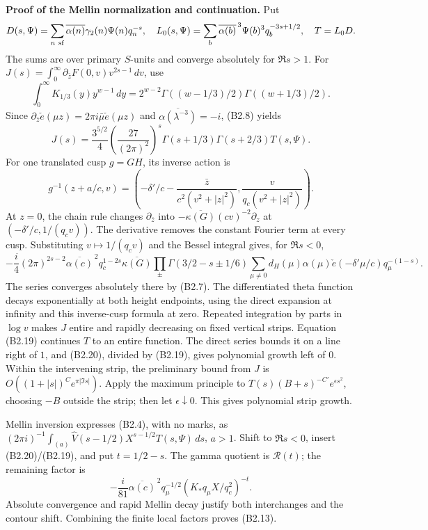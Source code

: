 \documentclass[11pt,a4paper]{article}
\begin{document}
\textbf{Proof of the Mellin normalization and continuation.} Put \[
D(s,\Psi)=\sum_{n\ {\rm sf}}\overline{\alpha(n)}\gamma_2(n)\Psi(n)q_n^{-s},
\quad L_0(s,\Psi)=\sum_b\overline{\alpha(b)}^{\,3}\Psi(b)^3q_b^{-3s+1/2},
\quad T=L_0D.
\] The sums are over primary \(S\)-units and converge absolutely for
\(\Re s>1\). For
\(J(s)=\int_0^\infty\partial_{\bar z}F(0,\allowbreak{}v)v^{2s-1}\,\allowbreak{}dv\), use \[
\int_0^\infty K_{1/3}(y)y^{w-1}\,dy
=2^{w-2}\Gamma((w-1/3)/2)\Gamma((w+1/3)/2).
\] Since
\(\partial_{\bar z}\check e(\mu z)=2\pi i\bar\mu\check e(\mu z)\) and
\(\overline{\alpha(\lambda^{-3})}=-i\), (B2.8) yields \[
J(s)=\frac{3^{5/2}}4\left(\frac{27}{(2\pi)^2}\right)^s
\Gamma(s+1/3)\Gamma(s+2/3)T(s,\Psi).
\tag{B2.19}
\] For one translated cusp \(g=GH\), its inverse action is \[
g^{-1}(z+a/c,v)=
\left(-\delta'/c-\frac{\bar z}{c^2(v^2+|z|^2)},
      \frac{v}{q_c(v^2+|z|^2)}\right).
\] At \(z=0\), the chain rule changes \(\partial_{\bar z}\) into
\(-\overline{\kappa(G)}(cv)^{-2}\partial_z\) at
\((-\delta'/c,\allowbreak{}1/(q_cv))\). The derivative removes the constant Fourier
term at every cusp. Substituting \(v\mapsto1/(q_cv)\) and the Bessel
integral gives, for \(\Re s<0\), \[
-\frac i4(2\pi)^{2s-2}\overline{\alpha(c)}^{\,2}q_c^{1-2s}
\overline{\kappa(G)}
\prod_\pm\Gamma(3/2-s\pm1/6)
\sum_{\mu\ne0}d_H(\mu)\alpha(\mu)\check e(-\delta'\mu/c)q_\mu^{-(1-s)}.
\tag{B2.20}
\] The series converges absolutely there by (B2.7). The differentiated
theta function decays exponentially at both height endpoints, using the
direct expansion at infinity and this inverse-cusp formula at zero.
Repeated integration by parts in \(\log v\) makes \(J\) entire and
rapidly decreasing on fixed vertical strips. Equation (B2.19) continues
\(T\) to an entire function. The direct series bounds it on a line right
of \(1\), and (B2.20), divided by (B2.19), gives polynomial growth left
of \(0\). Within the intervening strip, the preliminary bound from \(J\)
is \(O((1+|s|)^C e^{\pi|\Im s|})\). Apply the maximum principle to
\(T(s)(B+s)^{-C'}e^{\epsilon s^2}\), choosing \(-B\) outside the strip;
then let \(\epsilon\downarrow0\). This gives polynomial strip growth.

Mellin inversion expresses (B2.4), with no marks, as
\((2\pi i)^{-1}\int_{(a)}\widehat V(s-1/2)X^{s-1/2}T(s,\allowbreak{}\Psi)\,\allowbreak{}ds\),
\(a>1\). Shift to \(\Re s<0\), insert (B2.20)/(B2.19), and put
\(t=1/2-s\). The gamma quotient is \(\mathcal R(t)\); the remaining
factor is \[
-\frac i{81}\overline{\alpha(c)}^{\,2}q_\mu^{-1/2}
(K_*q_\mu X/q_c^2)^{-t}.
\] Absolute convergence and rapid Mellin decay justify both interchanges
and the contour shift. Combining the finite local factors proves
(B2.13).
\end{document}
